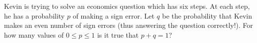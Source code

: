 Kevin is trying to solve an economics question which has six steps. At each step, he has a probability $p$ of making a sign error. Let $q$ be the probability that Kevin makes an even number of sign errors (thus answering the question correctly!). For how many values of $0 \le p \le 1$ is it true that $p+q=1$?

